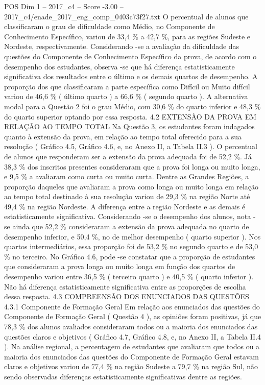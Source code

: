 \begin{textsample}{POS Dim 1 – 2017\_c4 – Score -3.00 – 2017\_c4/enade\_2017\_eng\_comp\_0403c73f27.txt}
O percentual de alunos que classificaram o grau de dificuldade como Médio, no Componente de Conhecimento Específico, variou de 33,4 \% a 42,7 \%, para as regiões Sudeste e Nordeste, respectivamente.
Considerando -se a avaliação da dificuldade das questões do Componente de Conhecimento Específico da prova, de acordo com o desempenho dos estudantes, observa -se que há diferença estatisticamente significativa dos resultados entre o último e os demais quartos de desempenho.
A proporção dos que classificaram a parte específica como Difícil ou Muito difícil variou de 46,6 \% ( último quarto ) a 66,6 \% ( segundo quarto ).
A alternativa modal para a Questão 2 foi o grau Médio, com 30,6 \% do quarto inferior e 48,3 \% do quarto superior optando por essa resposta. 4.2 EXTENSÃO DA PROVA EM RELAÇÃO AO TEMPO TOTAL Na Questão 3, os estudantes foram indagados quanto à extensão da prova, em relação ao tempo total oferecido para a sua resolução ( Gráfico 4.5, Gráfico 4.6, e, no Anexo II, a Tabela II.3 ).
O percentual de alunos que responderam ser a extensão da prova adequada foi de 52,2 \%.
Já 38,3 \% dos inscritos presentes consideraram que a prova foi longa ou muito longa, e 9,5 \% a avaliaram como curta ou muito curta.
Dentre as Grandes Regiões, a proporção daqueles que avaliaram a prova como longa ou muito longa em relação ao tempo total destinado à sua resolução variou de 29,3 \% na região Norte até 49,4 \% na região Nordeste.
A diferença entre a região Nordeste e as demais é estatisticamente significativa.
Considerando -se o desempenho dos alunos, nota -se ainda que 52,2 \% consideraram a extensão da prova adequada no quarto de desempenho inferior, e 50,4 \%, no de melhor desempenho ( quarto superior ).
Nos quartos intermediários, essa proporção foi de 53,2 \% no segundo quarto e de 53,0 \% no terceiro.
No Gráfico 4.6, pode -se constatar que a proporção de estudantes que consideraram a prova longa ou muito longa em função dos quartos de desempenho variou entre 36,5 \% ( terceiro quarto ) e 40,5 \% ( quarto inferior ).
Não há diferença estatisticamente significativa entre as proporções de escolha dessa resposta. 4.3 COMPREENSÃO DOS ENUNCIADOS DAS QUESTÕES 4.3.1 Componente de Formação Geral Em relação aos enunciados das questões do Componente de Formação Geral ( Questão 4 ), as opiniões foram positivas, já que 78,3 \% dos alunos avaliados consideraram todos ou a maioria dos enunciados das questões claros e objetivos ( Gráfico 4.7, Gráfico 4.8, e, no Anexo II, a Tabela II.4 ).
Na análise regional, a percentagem de estudantes que avaliaram que todos ou a maioria dos enunciados das questões do Componente de Formação Geral estavam claros e objetivos variou de 77,4 \% na região Sudeste a 79,7 \% na região Sul, não sendo observadas diferenças estatisticamente significativas dentre as regiões.

\end{textsample}
